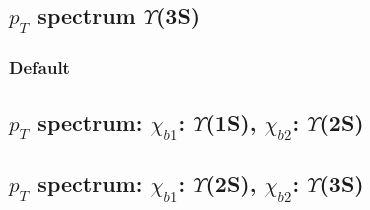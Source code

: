 \documentclass[a4paper,12pt]{article}
\begin{document}
\subsection*{$p_T$ spectrum $\Upsilon$(3S)}
\subsubsection{Default}

% 
% 
% 


% 

% 

\subsection*{$p_T$ spectrum: $\chi_{b1}$: $\Upsilon$(1S), $\chi_{b2}$: $\Upsilon$(2S)}


\subsection*{$p_T$ spectrum: $\chi_{b1}$: $\Upsilon$(2S), $\chi_{b2}$: $\Upsilon$(3S)}


% 
\end{document}
